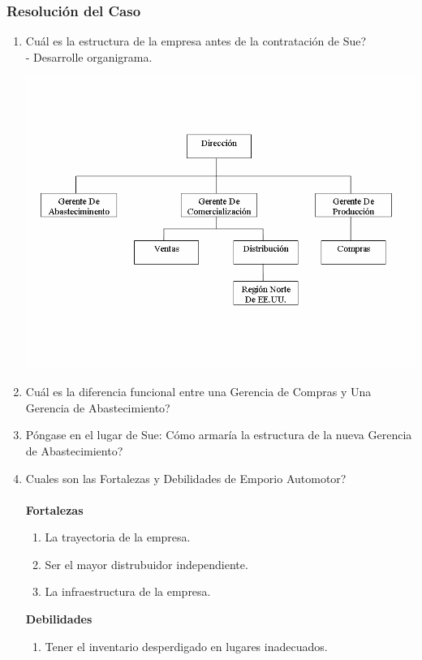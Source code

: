 \documentclass[a4paper,10pt,titlepage]{article}
\begin{document}
\subsubsection{Resoluci\'on del Caso}

\begin{enumerate}
  \item Cu\'al es la estructura de la empresa antes de la contrataci\'on de Sue?\\
  - Desarrolle organigrama.
     \begin{center}
      \includegraphics[scale=0.55]{./orgEmporioAutomotor.png}
     \end{center}
  
  \item Cu\'al es la diferencia funcional entre una Gerencia de Compras y Una Gerencia de Abastecimiento?
  \item P\'ongase en el lugar de Sue: C\'omo armar\'ia la estructura de la nueva Gerencia de Abastecimiento?
  \item Cuales son las Fortalezas y Debilidades de Emporio Automotor?\\ 
    \\ \textbf{Fortalezas }\\
    
    \begin{enumerate}
      \item La trayectoria de la empresa.
      \item Ser el mayor distrubuidor independiente.
      \item La infraestructura de la empresa.
     \end{enumerate}  
    \textbf{Debilidades} \\ 
   \begin{enumerate}
     \item Tener el inventario desperdigado en lugares inadecuados.
  
   \end{enumerate} 
\end{enumerate}
\end{document}
